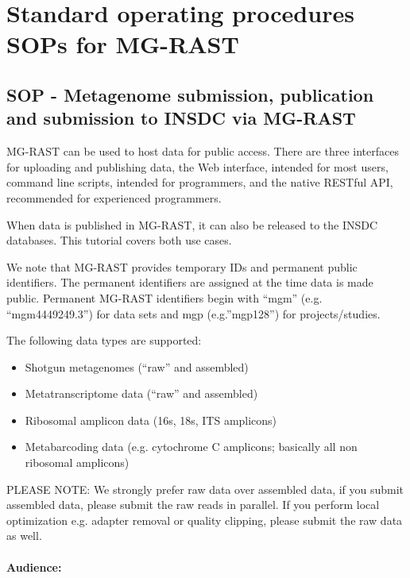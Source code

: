 \documentclass[12pt,fullpage]{report}
\begin{document}



\chapter{Standard operating procedures SOPs for MG-RAST}

\section{SOP - Metagenome submission, publication and submission to INSDC via MG-RAST }
MG-RAST can be used to host data for public access. There are three interfaces for uploading and publishing data, the Web interface, intended for most users, command line scripts, intended for programmers, and the native RESTful API, recommended for experienced programmers.

When data is published in MG-RAST, it can also be released to the INSDC databases. This tutorial covers both use cases.

We note that MG-RAST provides temporary IDs and permanent public identifiers. The permanent identifiers are assigned at the time data is made public. Permanent MG-RAST identifiers begin with “mgm” (e.g. “mgm4449249.3”) for data sets and mgp (e.g.”mgp128”) for projects/studies.

The following data types are supported:

\begin{itemize}

\item    Shotgun metagenomes (“raw” and assembled)
\item    Metatranscriptome data (“raw” and assembled)
\item    Ribosomal amplicon data (16s, 18s, ITS amplicons)
\item    Metabarcoding data (e.g. cytochrome C amplicons; basically all non ribosomal amplicons)

\end{itemize}

PLEASE NOTE: We strongly prefer raw data over assembled data, if you submit assembled data, please submit the raw reads in parallel. If you perform local optimization e.g. adapter removal or quality clipping, please submit the raw data as well.

\subsubsection{Audience:}
\end{document}
